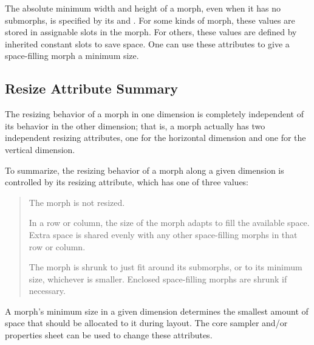 \documentclass[letterpaper,10pt,english]{sphinxmanual}
\begin{document}
The absolute minimum width and height of a morph, even when it has no submorphs, is specified by its  and . For some kinds of morph, these values are stored in assignable slots in the morph. For others, these values are defined by inherited constant slots to save space. One can use these attributes to give a space-filling morph a minimum size.


\subsection{Resize Attribute Summary}
\label{\detokenize{morphic:resize-attribute-summary}}\label{\detokenize{morphic:id1}}
The resizing behavior of a morph in one dimension is completely independent of its behavior in the other dimension; that is, a morph actually has two independent resizing attributes, one for the horizontal dimension and one for the vertical dimension.

To summarize, the resizing behavior of a morph along a given dimension is controlled by its resizing attribute, which has one of three values:
\begin{quote}

 The morph is not resized.

 In a row or column, the size of the morph adapts to fill the available space. Extra space is shared evenly with any other space-filling morphs in that row or column.

 The morph is shrunk to just fit around its submorphs, or to its minimum size, whichever is smaller. Enclosed space-filling morphs are shrunk if necessary.
\end{quote}

A morph's minimum size in a given dimension determines the smallest amount of space that should be allocated to it during layout. The core sampler and/or properties sheet can be used to change these attributes.
\end{document}
